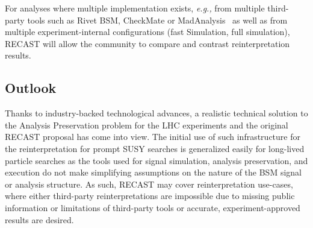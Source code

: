 For analyses where multiple implementation exists, \emph{e.g.,} from multiple third-party tools such as Rivet BSM, CheckMate or MadAnalysis~\cite{Conte:2014zja,Dumont:2014tja} as well as from multiple experiment-internal configurations (fast Simulation, full simulation), RECAST will allow the community to compare and contrast reinterpretation results.

\subsection{Outlook}

Thanks to industry-backed technological advances, a realistic technical solution to the Analysis Preservation problem for the LHC experiments and the original RECAST proposal has come into view. The initial use of such infrastructure for the reinterpretation for prompt SUSY searches is generalized easily for long-lived particle searches as the tools used for  signal simulation, analysis preservation, and execution do not make simplifying assumptions on the nature of the BSM signal or analysis structure.  As such, RECAST may cover reinterpretation use-cases, where either third-party reinterpretations are impossible due to missing public information or limitations of third-party tools or accurate, experiment-approved results are desired.
